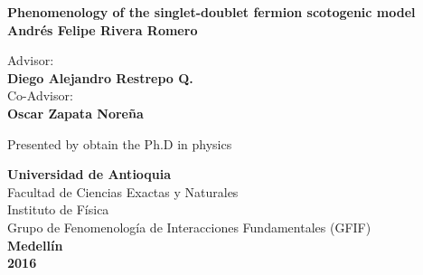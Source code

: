 \pagestyle{empty}


\begin{center}


\vspace*{2.0 cm} {\bf{\Large{Phenomenology of the singlet-doublet fermion scotogenic model }}}
\\
\vspace{2.5cm} \bf{\Large{Andr\'es Felipe Rivera Romero}}
\\
\vspace{2.0cm}

{\large Advisor:}\\
{\bf\large Diego Alejandro Restrepo Q.}\\
\vspace{1.0cm}
{\large Co-Advisor:}\\
{\bf\large Oscar Zapata Nore\~na}\\
\vspace{2.0cm}

Presented by obtain the Ph.D in physics
\vspace{2.5cm}

{\bf{ \Large{Universidad de Antioquia}}} \\
{\large{Facultad de Ciencias Exactas y Naturales}}\\
{\large{Instituto de F\'isica}} \\
{\large{Grupo de Fenomenolog\'ia de Interacciones Fundamentales (GFIF)}} \\
\vspace{1cm} {\bf\large Medell\'in \\ 2016}
\end{center}
